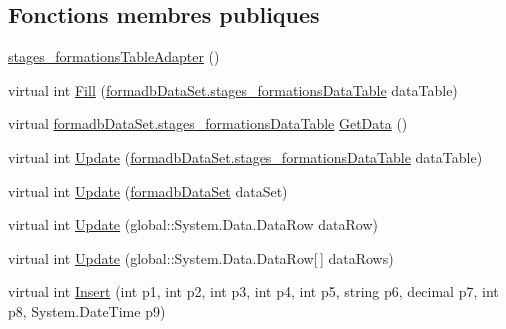 \subsection*{Fonctions membres publiques}
\begin{DoxyCompactItemize}
\item 
\hyperlink{classforma_1_1formadb_data_set_table_adapters_1_1stages__formations_table_adapter_a8eb1b409249ae31daf8175fa65eadbbc}{stages\+\_\+formations\+Table\+Adapter} ()
\item 
virtual int \hyperlink{classforma_1_1formadb_data_set_table_adapters_1_1stages__formations_table_adapter_adb623136a17b4d63226d3c52f6186a46}{Fill} (\hyperlink{classforma_1_1formadb_data_set_1_1stages__formations_data_table}{formadb\+Data\+Set.\+stages\+\_\+formations\+Data\+Table} data\+Table)
\item 
virtual \hyperlink{classforma_1_1formadb_data_set_1_1stages__formations_data_table}{formadb\+Data\+Set.\+stages\+\_\+formations\+Data\+Table} \hyperlink{classforma_1_1formadb_data_set_table_adapters_1_1stages__formations_table_adapter_aaf0ffc86a6b158f8ba6a27f782e9dea2}{Get\+Data} ()
\item 
virtual int \hyperlink{classforma_1_1formadb_data_set_table_adapters_1_1stages__formations_table_adapter_ab25e9b9c2e695aa026b6e3acdbe10cec}{Update} (\hyperlink{classforma_1_1formadb_data_set_1_1stages__formations_data_table}{formadb\+Data\+Set.\+stages\+\_\+formations\+Data\+Table} data\+Table)
\item 
virtual int \hyperlink{classforma_1_1formadb_data_set_table_adapters_1_1stages__formations_table_adapter_aed43e0318b4fb0253482636c7aa15455}{Update} (\hyperlink{classforma_1_1formadb_data_set}{formadb\+Data\+Set} data\+Set)
\item 
virtual int \hyperlink{classforma_1_1formadb_data_set_table_adapters_1_1stages__formations_table_adapter_a7c89e772ca93c4ecdc589b8cc5b41c58}{Update} (global\+::\+System.\+Data.\+Data\+Row data\+Row)
\item 
virtual int \hyperlink{classforma_1_1formadb_data_set_table_adapters_1_1stages__formations_table_adapter_a1f4d10d69dc1309f43570840fdb6ca88}{Update} (global\+::\+System.\+Data.\+Data\+Row\mbox{[}$\,$\mbox{]} data\+Rows)
\item 
virtual int \hyperlink{classforma_1_1formadb_data_set_table_adapters_1_1stages__formations_table_adapter_a72a582e5a702a261f43a87f0bc383791}{Insert} (int p1, int p2, int p3, int p4, int p5, string p6, decimal p7, int p8, System.\+Date\+Time p9)
\end{DoxyCompactItemize}
